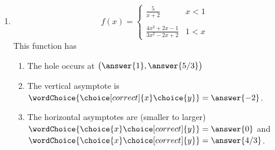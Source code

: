 \documentclass{ximera}
\begin{document}
\begin{exercise}
\begin{enumerate}
\item \begin{equation*}
	f(x) = \begin{cases}
		\frac{5}{x+2}  &  x < 1 \\
		\\
		\frac{4x^2+2x-1}{3x^2-2x+2}  & 1< x 
		\end{cases}
		\end{equation*}
This function has
\begin{selectAll}
\end{selectAll}
%
\begin{exercise}
\begin{enumerate}
\item The hole occurs at $\big(\answer{1},\answer{5/3}\big)$

\item The vertical asymptote is $\wordChoice{\choice[correct]{x}\choice{y}} = \answer{-2}$.

\item The horizontal asymptotes are (smaller to larger) \\
$\wordChoice{\choice{x}\choice[correct]{y}} = \answer{0}$ and $\wordChoice{\choice{x}\choice[correct]{y}} = \answer{4/3}$.
\end{enumerate}
\end{exercise}


\end{enumerate}
\end{exercise}
\end{document}
